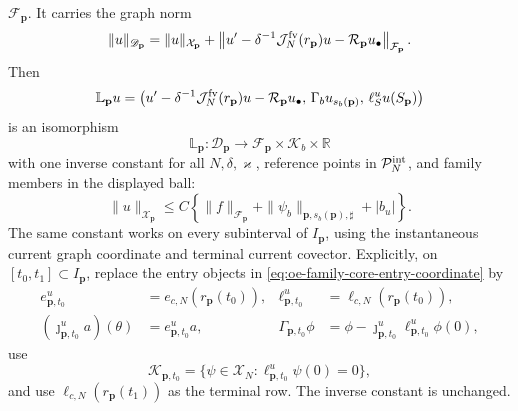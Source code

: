 \begin{theorem}
\(\mathcal F_{\mathbf p}\).  It carries the graph norm
\begin{equation}
 \|u\|_{\mathscr D_{\mathbf p}}
 =\|u\|_{\mathcal X_{\mathbf p}}
 +\left\|u'-\delta^{-1}\mathcal J_N^{\rm fv}(r_{\mathbf p})u
       -\mathcal R_{\mathbf p}u_\bullet\right\|_{
          \mathcal F_{\mathbf p}}.             \label{eq:oe-family-core-domain-graph-norm}
\end{equation}
Then
\begin{equation}
 \mathbb L_{\mathbf p}u
 =\left(u'-\delta^{-1}\mathcal J_N^{\rm fv}(r_{\mathbf p})u
       -\mathcal R_{\mathbf p}u_\bullet,\,
       \Gamma_bu_{s_b(\mathbf p)},\,
       \ell_S^uu(S_{\mathbf p})\right)         \label{eq:oe-family-core-mixed-operator}
\end{equation}
is an isomorphism
\begin{equation}
 \mathbb L_{\mathbf p}:\mathscr D_{\mathbf p}
 \longrightarrow
 \mathcal F_{\mathbf p}\times\mathscr K_b\times\mathbb R
                                                        \label{eq:oe-family-core-mixed-isomorphism}
\end{equation}
with one inverse constant for all \(N,\delta,\varkappa\), reference points
in \(\mathcal P_N^{\rm int}\), and family members in the displayed ball:
\begin{equation}
 \|u\|_{\mathcal X_{\mathbf p}}
 \le C\left\{\|f\|_{\mathcal F_{\mathbf p}}
       +\|\psi_b\|_{\mathbf p,s_b(\mathbf p),\sharp}
       +|b_u|\right\}.                         \label{eq:oe-family-core-mixed-green-bound}
\end{equation}
The same constant works on every subinterval of \(I_{\mathbf p}\), using
the instantaneous current graph coordinate and terminal current covector.
Explicitly, on \([t_0,t_1]\subset I_{\mathbf p}\), replace the entry
objects in \cref{eq:oe-family-core-entry-coordinate} by
\begin{align*}
 e_{\mathbf p,t_0}^u&=e_{c,N}(r_{\mathbf p}(t_0)),&
 \ell_{\mathbf p,t_0}^u&=\ell_{c,N}(r_{\mathbf p}(t_0)),\\
 (\jmath_{\mathbf p,t_0}^ua)(\theta)&=e_{\mathbf p,t_0}^ua,&
 \Gamma_{\mathbf p,t_0}\phi
 &=\phi-\jmath_{\mathbf p,t_0}^u
       \ell_{\mathbf p,t_0}^u\phi(0),
\end{align*}
use
\[
 \mathscr K_{\mathbf p,t_0}
 =\{\psi\in\mathscr X_N:
       \ell_{\mathbf p,t_0}^u\psi(0)=0\},
\]
and use
\(\ell_{c,N}(r_{\mathbf p}(t_1))\) as the terminal row.  The inverse
constant is unchanged.


\end{theorem}
